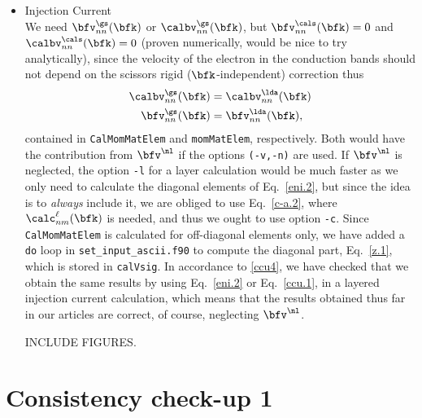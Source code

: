 \begin{itemize}
\item Injection Current\\
We need 
$\bfv^\gs_{nn}(\bfk)$
 or 
$\calbv^\gs_{nn}(\bfk)$, but $\bfv^\cals_{nn}(\bfk)=0$
and 
$\calbv^\cals_{nn}(\bfk)=0$ (proven numerically, would be nice to try
analytically), since the velocity of the electron in the conduction
bands should not depend on the scissors rigid ($\bfk$-independent) correction thus
\begin{align}\label{z.1}
\calbv^\gs_{nn}(\bfk)&=\calbv^\lda_{nn}(\bfk)
\nonumber\\ 
\bfv^\gs_{nn}(\bfk)&=\bfv^\lda_{nn}(\bfk) 
,
\end{align}
contained in  \verb=CalMomMatElem= and  \verb=momMatElem=,
respectively. Both would have the contribution from $\bfv^\nl$ if the
options \verb=(-v,-n)= are used. If $\bfv^\nl$ is neglected, the
option \verb=-l= for a layer calculation would be much faster as we
only need to calculate the diagonal elements of Eq.~\eqref{eni.2}, but
since the idea is to {\it always} include it, we are obliged to use
Eq.~\eqref{c-a.2}, where $\calc^\ell_{nm}(\bfk)$ is needed, and thus
we ought to use option \verb=-c=. 
Since  \verb=CalMomMatElem= is calculated for off-diagonal elements
only, we have added a \verb=do= loop in \verb=set_input_ascii.f90=
 to compute the diagonal  part, Eq.~\eqref{z.1}, which is
stored in \verb=calVsig=. In accordance to \ref{ccu4}, we have checked
that we obtain the same results by using Eq.~\eqref{eni.2} or
Eq.~\eqref{ccu.1}, in a layered injection current calculation, which
means that the results obtained thus far in our articles are correct,
of course, neglecting $\bfv^\nl$.

INCLUDE FIGURES.
\end{itemize}

\section{Consistency check-up 1}

